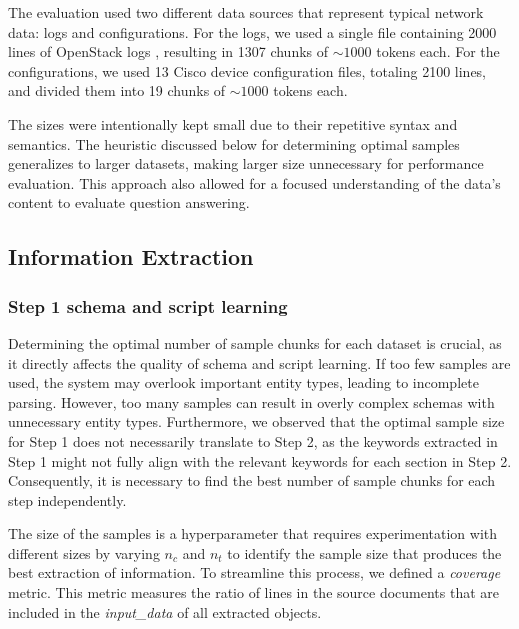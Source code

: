 \documentclass[conference]{IEEEtran}
\begin{document}
The evaluation used two different data sources that represent typical network data: logs and configurations. 
For the logs, we used a single file containing 2000 lines of OpenStack logs \cite{zhu2023Loghub}, resulting in 1307 chunks of $\sim1000$ tokens each. 
For the configurations, we used 13 Cisco device configuration files, totaling 2100 lines, and divided them into 19 chunks of $\sim1000$ tokens each.

The sizes were intentionally kept small due to their repetitive syntax and semantics. The heuristic discussed below for determining optimal samples generalizes to larger datasets, making larger size unnecessary for performance evaluation. This approach also allowed for a focused understanding of the data's content to evaluate question answering.

\subsection{Information Extraction}
\subsubsection{Step 1 schema and script learning}
Determining the optimal number of sample chunks for each dataset is crucial, as it directly affects the quality of schema and script learning. If too few samples are used, the system may overlook important entity types, leading to incomplete parsing. However, too many samples can result in overly complex schemas with unnecessary entity types. Furthermore, we observed that the optimal sample size for Step 1 does not necessarily translate to Step 2, as the keywords extracted in Step 1 might not fully align with the relevant keywords for each section in Step 2. Consequently, it is necessary to find the best number of sample chunks for each step independently.

The size of the samples is a hyperparameter that requires experimentation with different sizes by varying $n_c$ and $n_t$ to identify the sample size that produces the best extraction of information. 
To streamline this process, we defined a \textit{coverage} metric. This metric measures the ratio of lines in the source documents that are included in the \textit{input\_data} of all extracted objects.
\end{document}
